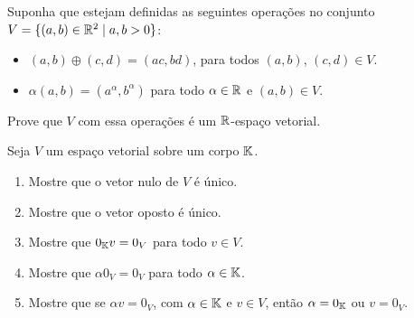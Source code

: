 \documentclass[12pt]{exam}
\begin{document}

\begin{exercicio}
  Suponha que estejam definidas as seguintes opera\c{c}\~oes no conjunto $V = \{(a, b) \in \mathbb{R}^2 \mid a, b > 0\}$:
  \begin{itemize}
    \item $(a, b) \oplus (c, d) = (ac, bd)$, para todos $(a,b)$, $(c,d) \in V$.
    \item $\alpha (a, b) = (a^\alpha, b^\alpha)$ para todo $\alpha \in \mathbb{R}$ e $(a, b) \in V$.
  \end{itemize}
  Prove que $V$ com essa opera\c{c}\~oes \'e um $\mathbb{R}$-espa\c{c}o vetorial.
\end{exercicio}

\begin{exercicio}
  Seja $V$ um espa\c{c}o vetorial sobre um corpo $\mathbb{K}$.
  \begin{enumerate}[label={\alph*})]
    \item Mostre que o vetor nulo de $V$ \'e \'unico.
    \item Mostre que o vetor oposto \'e \'unico.
    \item Mostre que $0_{\mathbb{K}} v = 0_V$ para todo $v \in V$.
    \item Mostre que $\alpha 0_V = 0_V$ para todo $\alpha \in \mathbb{K}$.
    \item Mostre que se $\alpha v = 0_V$, com $\alpha \in \mathbb{K}$ e $v \in V$, ent\~ao $\alpha = 0_{\mathbb{K}}$ ou $v = 0_V$.
  \end{enumerate}
\end{exercicio}
\end{document}
